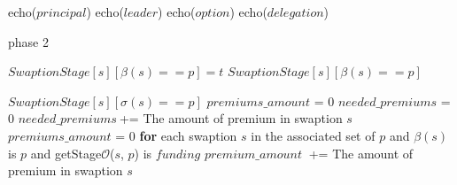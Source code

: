 \begin{enumerate}
\begin{algorithm} [H]
\begin{algorithmic} [1]
    \Else
        \State echo($principal$)
        \State echo($leader$)
        \State echo($option$)
        \State echo($delegation$)

    \EndIf
\end{algorithmic}
\end{algorithm}   
    

    \begin{algorithm}
    \caption{phase 2}
    \label{alg:phase-2}
    \begin{algorithmic}
    \State $SwaptionStage[s][\beta(s)==p]=t$ 
    \EndFunction
    \State \Return $SwaptionStage[s][\beta(s)== p]$
    \EndFunction

    \State \Return $SwaptionStage[s][\sigma(s)== p]$
    \EndFunction
    \State $premiums\_amount$ = 0
    \State $needed\_premiums$ = 0
    \vspace{-1.2em}
    \State {}
    \State $needed\_premiums\ $+= The amount of premium in swaption $s$
    \EndFor
    \State \tab $premiums\_amount$ = 0
    \State \tab\textbf{for }each swaption $s$ in the associated set of $p$ and $\beta(s)$ is $p$ and getStage$\mathcal{O}$($s$, $p$) is $funding$
    \State \tab \tab $premium\_amount\ $ += The amount of premium in swaption $s$
    \EndWhile
    
\end{algorithmic}
\end{algorithm}


\end{enumerate}
